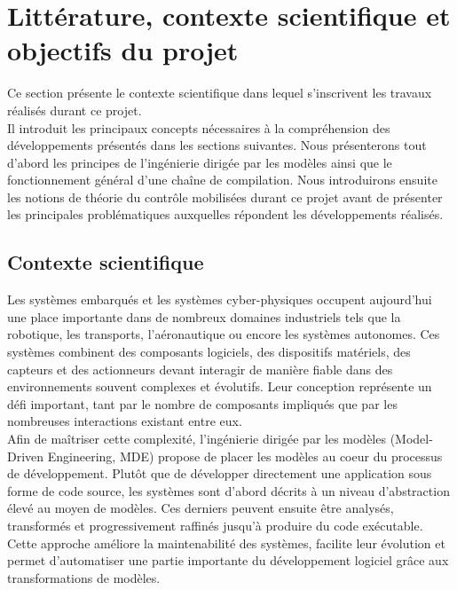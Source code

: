 \section{Littérature, contexte scientifique et objectifs du projet}
\label{sec:etats_de_art}

Ce section présente le contexte scientifique dans lequel s'inscrivent les travaux réalisés durant ce projet. \\

Il introduit les principaux concepts nécessaires à la compréhension des développements présentés dans les sections suivantes. Nous présenterons tout d'abord les principes de l'ingénierie dirigée par les modèles ainsi que le fonctionnement général d'une chaîne de compilation. Nous introduirons ensuite les notions de théorie du contrôle mobilisées durant ce projet avant de présenter les principales problématiques auxquelles répondent les développements réalisés. \\

\subsection{Contexte scientifique}

Les systèmes embarqués et les systèmes cyber-physiques occupent aujourd'hui une place importante dans de nombreux domaines industriels tels que la robotique, les transports, l'aéronautique ou encore les systèmes autonomes. Ces systèmes combinent des composants logiciels, des dispositifs matériels, des capteurs et des actionneurs devant interagir de manière fiable dans des environnements souvent complexes et évolutifs. Leur conception représente un défi important, tant par le nombre de composants impliqués que par les nombreuses interactions existant entre eux. \\

Afin de maîtriser cette complexité, l'ingénierie dirigée par les modèles (Model-Driven Engineering, MDE) propose de placer les modèles au coeur du processus de développement. Plutôt que de développer directement une application sous forme de code source, les systèmes sont d'abord décrits à un niveau d'abstraction élevé au moyen de modèles. Ces derniers peuvent ensuite être analysés, transformés et progressivement raffinés jusqu'à produire du code exécutable. Cette approche améliore la maintenabilité des systèmes, facilite leur évolution et permet d'automatiser une partie importante du développement logiciel grâce aux transformations de modèles. \\

